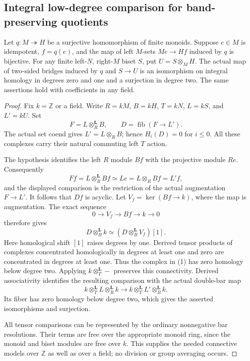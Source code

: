 \subsection{Integral low-degree comparison for band-preserving quotients}

\begin{lemma}
\label{CP2:A-integral-column-bridge-connectivity}
Let $q:M\twoheadrightarrow H$ be a surjective homomorphism of
finite monoids.  Suppose $e\in M$ is idempotent, $f=q(e)$, and
the map of left $M$-sets $Me\to Hf$ induced by $q$ is bijective.
For any finite left-$N$, right-$M$ biset $S$, put
$U=S\otimes_M H$.  The actual map of two-sided bridges induced
by $q$ and $S\to U$ is an isomorphism on integral homology in
degrees zero and one and a surjection in degree two.
The same assertions hold with coefficients in any field.
\end{lemma}
\begin{proof}
Fix $k=\mathbb Z$ or a field.  Write $R=kM$, $B=kH$,
$T=kN$, $L=kS$, and $L'=kU$.  Set
\[
 F=L\otimes_R^{\mathbf L}B,\qquad
 D=\operatorname{fib}(F\longrightarrow L').
\]
The actual set coend gives $L'=L\otimes_R B$; hence
$H_i(D)=0$ for $i\leq0$.  All these complexes carry their
natural commuting left $T$ action.

The hypothesis identifies the left $R$ module $Bf$ with
the projective module $Re$.  Consequently
\[
 Ff=L\otimes_R^{\mathbf L}Bf\simeq Le
       =L\otimes_R Bf=L'f ,
\]
and the displayed comparison is the restriction of the actual
augmentation $F\to L'$.  It follows that $Df$ is acyclic.
Let $V_f=\ker(Bf\to k)$, where the map is augmentation.
The exact sequence
\[
       0\longrightarrow V_f\longrightarrow Bf
                      \longrightarrow k\longrightarrow0
\]
therefore gives
\[
 D\otimes_B^{\mathbf L}k
       \simeq (D\otimes_B^{\mathbf L}V_f)[1].
                                                               \tag{1}
\]
Here homological shift $[1]$ raises degrees by one.
Derived tensor products of complexes concentrated homologically
in degrees at least one and zero are concentrated in degrees
at least one.  Thus the complex in (1) has zero homology below
degree two.  Applying $k\otimes_T^{\mathbf L}-$ preserves this
connectivity.  Derived associativity identifies the resulting
comparison with the actual double-bar map
\[
 k\otimes_T^{\mathbf L}L\otimes_R^{\mathbf L}k
   \longrightarrow
 k\otimes_T^{\mathbf L}L'\otimes_B^{\mathbf L}k .
\]
Its fiber has zero homology below degree two, which gives
the asserted isomorphisms and surjection.

All tensor comparisons can be represented by the ordinary
nonnegative bar resolutions.  Their terms are free over the
appropriate monoid ring, since the monoid and biset modules
are free over $k$.  This supplies the needed connective models
over $\mathbb Z$ as well as over a field; no division or group
averaging occurs.
\end{proof}

